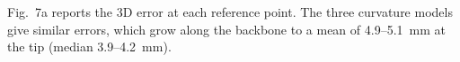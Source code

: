 Fig.~7a reports the 3D error at each reference point. The three curvature models give similar errors, which grow along the backbone to a mean of 4.9--5.1~mm at the tip (median 3.9--4.2~mm).
